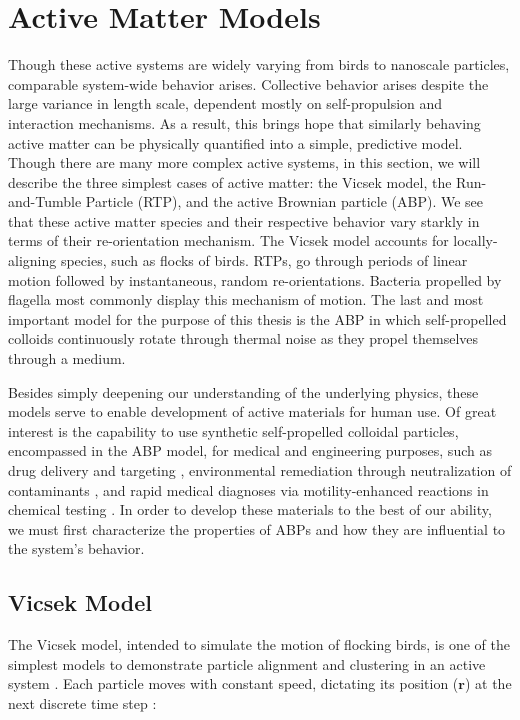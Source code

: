 \documentclass[11pt]{article}
\begin{document}
\section{Active Matter Models}

Though these active systems are widely varying from birds to nanoscale particles, comparable system-wide behavior arises. Collective behavior arises despite the large variance in length scale, dependent mostly on self-propulsion and interaction mechanisms. As a result, this brings hope that similarly behaving active matter can be physically quantified into a simple, predictive model.  Though there are many more complex active systems, in this section, we will describe the three simplest cases of active matter: the Vicsek model, the Run-and-Tumble Particle (RTP), and the active Brownian particle (ABP). We see that these active matter species and their respective behavior vary starkly in terms of their re-orientation mechanism.  The Vicsek model accounts for locally-aligning species, such as flocks of birds.  RTPs, go through periods of linear motion followed by instantaneous, random re-orientations.  Bacteria propelled by flagella most commonly display this mechanism of motion.  The last and most important model for the purpose of this thesis is the ABP in which self-propelled colloids continuously rotate through thermal noise as they propel themselves through a medium.

Besides simply deepening our understanding of the underlying physics, these models serve to enable development of active materials for human use.  Of great interest is the capability to use synthetic self-propelled colloidal particles, encompassed in the ABP model, for medical and engineering purposes, such as drug delivery and targeting \cite{Li, Orozco}, environmental remediation through neutralization of contaminants \cite{Gao2, Li3}, and rapid medical diagnoses via motility-enhanced reactions in chemical testing \cite{Garcia, Perez}.  In order to develop these materials to the best of our ability, we must first characterize the properties of ABPs and how they are influential to the system's behavior. 

\subsection{Vicsek Model}\label{VicsekModel}

The Vicsek model, intended to simulate the motion of flocking birds, is one of the simplest models to demonstrate particle alignment and clustering in an active system \cite{Vicsek}.  Each particle moves with constant speed, dictating its position ($\boldsymbol{r}$) at the next discrete time step \cite{Ginelli}:
\end{document}
